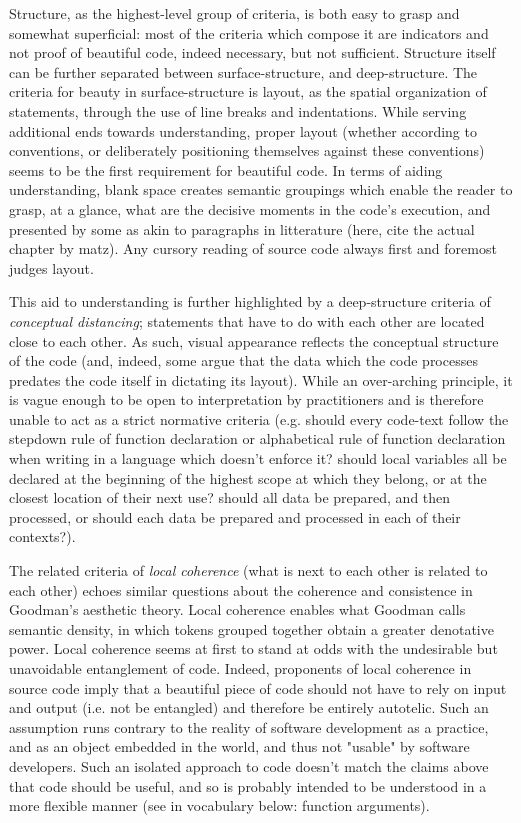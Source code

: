 Structure, as the highest-level group of criteria, is both easy to grasp and somewhat superficial: most of the criteria which compose it are indicators and not proof of beautiful code, indeed necessary,  but not sufficient. Structure itself can be further separated between surface-structure, and deep-structure. The criteria for beauty in surface-structure is layout, as the spatial organization of statements, through the use of line breaks and indentations. While serving additional ends towards understanding, proper layout (whether according to conventions, or deliberately positioning themselves against these conventions) seems to be the first requirement for beautiful code. In terms of aiding understanding, blank space creates semantic groupings which enable the reader to grasp, at a glance, what are the decisive moments \citep{sennett_craftsman_2009} in the code's execution, and presented by some as akin to paragraphs in litterature \citep{oram_beautiful_2007} (here, cite the actual chapter by matz). Any cursory reading of source code always first and foremost judges layout.

This aid to understanding is further highlighted by a deep-structure criteria of \emph{conceptual distancing}; statements that have to do with each other are located close to each other. As such, visual appearance reflects the conceptual structure of the code (and, indeed, some argue that the data which the code processes predates the code itself in dictating its layout). While an over-arching principle, it is vague enough to be open to interpretation by practitioners and is therefore unable to act as a strict normative criteria (e.g. should every code-text follow the stepdown rule of function declaration or alphabetical rule of function declaration when writing in a language which doesn't enforce it? should local variables all be declared at the beginning of the highest scope at which they belong, or at the closest location of their next use? should all data be prepared, and then processed, or should each data be prepared and processed in each of their contexts?).

The related criteria of \emph{local coherence} (what is next to each other is related to each other) echoes similar questions about the coherence and consistence in Goodman's aesthetic theory. Local coherence enables what Goodman calls semantic density, in which tokens grouped together obtain a greater denotative power. Local coherence seems at first to stand at odds with the undesirable but unavoidable entanglement of code. Indeed, proponents of local coherence in source code imply that a beautiful piece of code should not have to rely on input and output (i.e. not be entangled) and therefore be entirely autotelic. Such an assumption runs contrary to the reality of software development as a practice, and as an object embedded in the world, and thus not "usable" by software developers. Such an isolated approach to code doesn't match the claims above that code should be useful, and so is probably intended to be understood in a more flexible manner (see in vocabulary below: function arguments).


